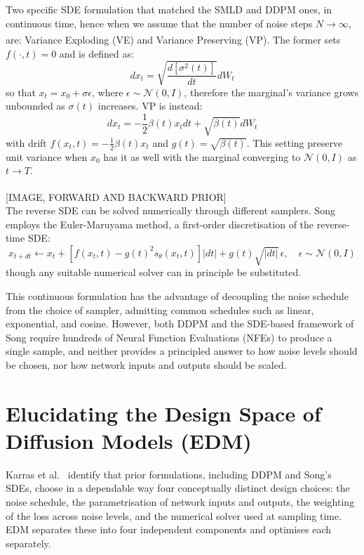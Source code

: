 Two specific SDE formulation that matched the SMLD and DDPM ones, in continuous time, hence when we assume that the number of noise steps \(N\xrightarrow[]{}\infty\), are: Variance Exploding (VE) and Variance Preserving (VP). The former sets \(f(\cdot,t)=0\) and is defined as:
\begin{equation}
    \label{eq:ve}
    dx_t=\sqrt{\frac{d[\sigma^2(t)]}{dt}}dW_t
\end{equation}
so that \(x_t=x_0+\sigma\epsilon\), where \(\epsilon\sim \mathcal{N}(0,I)\), therefore the marginal's variance grows unbounded as \(\sigma(t)\) increases. VP is instead:
$$dx_t=-\frac12 \beta(t)x_tdt+\sqrt{\beta(t)}dW_t$$
with drift \(f(x_t,t)=-\frac12\beta(t)x_t\) and \(g(t)=\sqrt{\beta(t)}\). This setting preserve unit variance when \(x_0\) has it as well with the marginal converging to \(\mathcal{N}(0,I)\) as \(t\xrightarrow[]{}T\).

[IMAGE, FORWARD AND BACKWARD PRIOR]\\

The reverse SDE can be solved numerically through different samplers. 
Song \cite{song2021score} employs the Euler-Maruyama method, a first-order 
discretisation of the reverse-time SDE:
$$
x_{t+dt} \leftarrow x_t + \left[f(x_t,t) - g(t)^2 s_\theta(x_t,t)\right]|dt| 
+ g(t)\sqrt{|dt|}\,\epsilon, \quad \epsilon \sim \mathcal{N}(0,I)
$$
though any suitable numerical solver can in principle be substituted.

This continuous formulation has the advantage of decoupling the noise schedule 
from the choice of sampler, admitting common schedules such as linear, 
exponential, and cosine. However, both DDPM \cite{ho2020ddpm} and the SDE-based 
framework of Song \cite{song2021score} require hundreds of Neural Function 
Evaluations (NFEs) to produce a single sample, and neither provides a principled 
answer to how noise levels should be chosen, nor how network inputs and outputs 
should be scaled.

\section{Elucidating the Design Space of Diffusion Models (EDM)}
\label{sec:edm_literature}
Karras et al.\ \cite{karras2022elucidating} identify that prior formulations, including 
DDPM and Song's SDEs, choose in a dependable way four conceptually distinct design choices: the noise schedule, the parametrisation of network inputs and outputs, the weighting 
of the loss across noise levels, and the numerical solver used at sampling time. 
EDM separates these into four independent components and optimises each 
separately.

